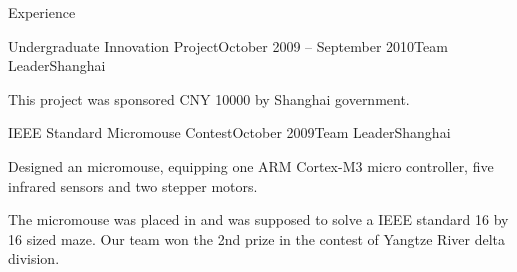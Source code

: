 \documentclass{resume} %
\begin{document}
\begin{rSection}{Experience}
\begin{rSubsection}{Undergraduate Innovation Project}{October 2009 -- September 2010}{Team Leader}{Shanghai}
    \item This project was sponsored CNY 10000 by Shanghai government.

    \end{rSubsection}

    \begin{rSubsection}{IEEE Standard Micromouse Contest}{October 2009}{Team Leader}{Shanghai}

    \item Designed an micromouse, equipping one ARM Cortex-M3 micro controller,
        five infrared sensors and two stepper motors.

    \item The micromouse was placed in and was supposed to solve a IEEE
        standard 16 by 16 sized maze.  Our team won the 2nd prize in the
        contest of Yangtze River delta division.

    \end{rSubsection}

\end{rSection}

\end{document}
